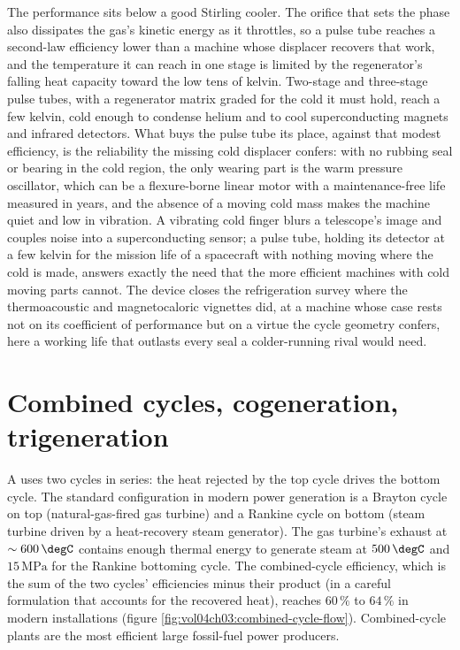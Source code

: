 The performance sits below a good Stirling cooler. The orifice that sets the phase
also dissipates the gas's kinetic energy as it throttles, so a pulse tube reaches a
second-law efficiency lower than a machine whose displacer recovers that work, and
the temperature it can reach in one stage is limited by the regenerator's falling
heat capacity toward the low tens of kelvin. Two-stage and three-stage pulse tubes,
with a regenerator matrix graded for the cold it must hold, reach a few kelvin, cold
enough to condense helium and to cool superconducting magnets and infrared
detectors. What buys the pulse tube its place, against that modest efficiency, is
the reliability the missing cold displacer confers: with no rubbing seal or bearing
in the cold region, the only wearing part is the warm pressure oscillator, which can
be a flexure-borne linear motor with a maintenance-free life measured in years, and
the absence of a moving cold mass makes the machine quiet and low in vibration. A
vibrating cold finger blurs a telescope's image and couples noise into a
superconducting sensor; a pulse tube, holding its detector at a few kelvin for the
mission life of a spacecraft with nothing moving where the cold is made, answers
exactly the need that the more efficient machines with cold moving parts cannot.
The device closes the refrigeration survey where the thermoacoustic and
magnetocaloric vignettes did, at a machine whose case rests not on its coefficient
of performance but on a virtue the cycle geometry confers, here a working life that
outlasts every seal a colder-running rival would need.



\section{Combined cycles, cogeneration, trigeneration}

A  uses two cycles in series: the heat
rejected by the top cycle drives the bottom cycle. The standard
configuration in modern power generation is a Brayton cycle on top
(natural-gas-fired gas turbine) and a Rankine cycle on bottom (steam
turbine driven by a heat-recovery steam generator). The gas turbine's
exhaust at $\sim 600\,\degC$ contains enough thermal energy to
generate steam at $500\,\degC$ and $15\,\text{MPa}$ for the Rankine
bottoming cycle. The combined-cycle efficiency, which is the sum of
the two cycles' efficiencies minus their product (in a careful
formulation that accounts for the recovered heat), reaches $60\,\%$
to $64\,\%$ in modern installations
(figure \ref{fig:vol04ch03:combined-cycle-flow}). Combined-cycle plants
are the most efficient large fossil-fuel power producers.

